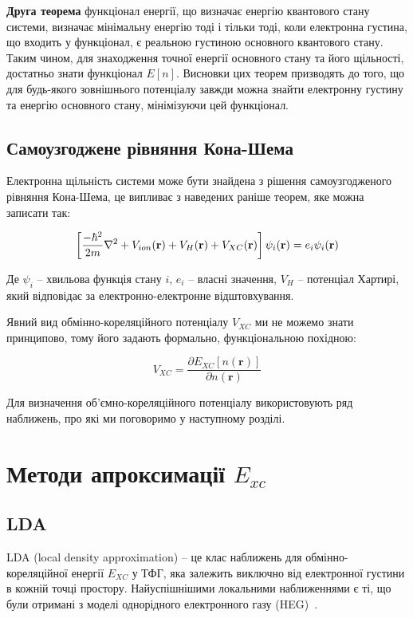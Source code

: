 \textbf{Друга теорема} функціонал енергії, що визначає енергію квантового стану системи, визначає мінімальну енергію тоді і тільки тоді, коли електронна густина, що входить у функціонал, є реальною густиною основного квантового стану.
Таким чином, для знаходження точної енергії основного стану та його щільності, достатньо знати функціонал $E[n]$. Висновки цих теорем призводять до того, що для будь-якого зовнішнього потенціалу завжди можна знайти електронну густину та енергію основного стану, мінімізуючи цей функціонал.


\subsection{Самоузгоджене рівняння Кона-Шема}
Електронна щільність системи може бути знайдена з рішення самоузгодженого рівняння Кона-Шема, це випливає з наведених раніше теорем, яке можна записати так:

\begin{equation}
    \left[{{-\hbar^2}\over{2m}}\nabla^2+V_{ion}(\textbf{r})+V_H(\textbf{r})+V_{XC}(\textbf{r})\right]\psi_i(\textbf{r}) = e_i\psi_i(\textbf{r})
\end{equation}

Де $\psi_i$ -- хвильова функція стану $i$, $e_i$ -- власні значення, $V_H$ -- потенціал Хартирі, який відповідає за електронно-електронне відштовхування.

Явний вид обмінно-кореляційного потенціалу $V_{XC}$ ми не можемо знати принципово, тому його задають формально, функціональною похідною: 

\begin{equation}
    V_{XC} = \frac{\partial E_{XC}[n(\textbf{r})]}{\partial n(\textbf{r})}
\end{equation}

Для визначення об'ємно-кореляційного потенціалу використовують ряд наближень, про які ми поговоримо у наступному розділі.


\section{Методи апроксимації \textbf{$E_{xc}$}}
\subsection{LDA}
LDA (local density approximation) -- це клас наближень для обмінно-кореляційної енергії $E_{XC}$ у ТФГ, яка залежить виключно від електронної густини в кожній точці простору. Найуспішнішими локальними наближеннями є ті, що були отримані з моделі однорідного електронного газу (HEG)~\cite{Hohenberg&Khon}. 

